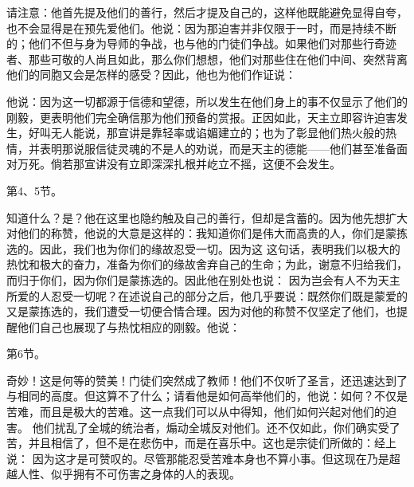 请注意：他首先提及他们的善行，然后才提及自己的，这样他既能避免显得自夸，也不会显得是在预先爱他们。他说：因为那迫害并非仅限于一时，而是持续不断的；他们不但与身为导师的争战，也与他的门徒们争战。如果他们对那些行奇迹者、那些可敬的人尚且如此，那么你们想想，他们对那些住在他们中间、突然背离他们的同胞又会是怎样的感受？因此，他也为他们作证说：\par

他说：因为这一切都源于信德和望德，所以发生在他们身上的事不仅显示了他们的刚毅，更表明他们完全确信那为他们预备的赏报。正因如此，天主立即容许迫害发生，好叫无人能说，那宣讲是靠轻率或谄媚建立的；也为了彰显他们热火般的热情，并表明那说服信徒灵魂的不是人的劝说，而是天主的德能——他们甚至准备面对万死。倘若那宣讲没有立即深深扎根并屹立不摇，这便不会发生。\par

第4、5节。\par

知道什么？是？他在这里也隐约触及自己的善行，但却是含蓄的。因为他先想扩大对他们的称赞，他说的大意是这样的：我知道你们是伟大而高贵的人，你们是蒙拣选的。因此，我们也为你们的缘故忍受一切。因为这 这句话，表明我们以极大的热忱和极大的奋力，准备为你们的缘故舍弃自己的生命；为此，谢意不归给我们，而归于你们，因为你们是蒙拣选的。因此他在别处也说： 因为岂会有人不为天主所爱的人忍受一切呢？在述说自己的部分之后，他几乎要说：既然你们既是蒙爱的又是蒙拣选的，我们遭受一切便合情合理。因为对他的称赞不仅坚定了他们，也提醒他们自己也展现了与热忱相应的刚毅。他说：\par

第6节。\par

奇妙！这是何等的赞美！门徒们突然成了教师！他们不仅听了圣言，还迅速达到了与相同的高度。但这算不了什么；请看他是如何高举他们的，他说：如何？不仅是苦难，而且是极大的苦难。这一点我们可以从中得知，他们如何兴起对他们的迫害。 他们扰乱了全城的统治者，煽动全城反对他们。还不仅如此，你们确实受了苦，并且相信了，但不是在悲伤中，而是在喜乐中。这也是宗徒们所做的：经上说： 因为这才是可赞叹的。尽管那能忍受苦难本身也不算小事。但这现在乃是超越人性、似乎拥有不可伤害之身体的人的表现。\par

